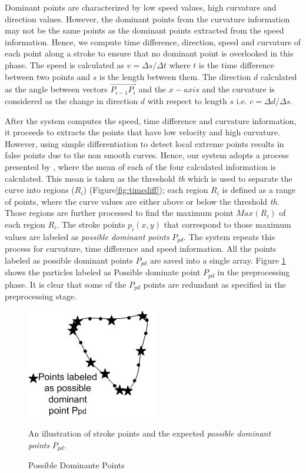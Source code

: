\documentclass[preprint,10pt,5p,twocolumn]{elsarticle}
\begin{document}
Dominant points are characterized by low speed values, high curvature and direction values. However, the dominant points from the curvature information may not be the same points as the dominant points extracted from the speed information. Hence, we compute time difference, direction, speed and curvature of each point along a stroke to ensure that no dominant point is overlooked in this phase. The speed is calculated as $v=\Delta s/\Delta t$ where $t$ is the time difference between two points and $s$ is the length between them. The direction $d$ calculated as the angle between vectors $\overrightarrow {P_{i - 1} P_i }$ and the $x-axis$ and the curvature is considered as the change in direction $d$ with respect to length $s$ i.e. $c= \Delta d/\Delta s$. 
  
After the system computes the speed, time difference and curvature information, it proceeds to extracts the points that have low velocity and high curvature. However, using simple differentiation to detect local extreme points results in false points due to the non smooth curves. Hence, our system adopts a process presented by \cite{earlyprocess}, where the mean of each of the four calculated information is calculated. This mean is taken as the threshold \textit{th} which is used to separate the curve into regions ($R_i$) (Figure\ref{fig:timediff}); each region $R_i$ is defined as a range of points, where the curve values are either above or below the threshold \textit{th}. Those regions are further processed to find the maximum point $Max(R_i)$ of each region $R_i$. The stroke points $p_i(x,y)$ that correspond to those maximum values are labeled as \textit{possible dominant points} $P_{pd}$. The system repeats this process for curvature, time difference and speed information. All the points labeled as possible dominant points $P_{pd}$ are saved into a single array. Figure \ref{fig:ppd999} shows the particles labeled as Possible dominate point $P_{pd}$ in the preprocessing phase. It is clear that some of the $P_{pd}$ points are redundant as specified in the preprocessing stage. %
\begin{figure}
	\centering
\includegraphics[scale=0.7]{images/ppd.jpg}
	\caption{Possible Dominante Points} An illustration of stroke points and the expected \textit{possible dominant points} $P_{pd}$.  
	\label{fig:ppd999}	
\end{figure}
\end{document}
